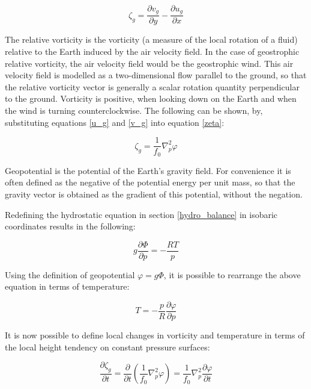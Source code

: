 \begin{equation}
    \zeta_g = \frac{\partial v_g}{\partial y} - \frac{\partial u_g}{\partial x}
    \label{zeta}
\end{equation}

The relative vorticity is the vorticity (a measure of the local rotation of a fluid) relative to the Earth induced by the air velocity field. In the case of geostrophic relative vorticity, the air velocity field would be the geostrophic wind. This air velocity field is modelled as a two-dimensional flow parallel to the ground, so that the relative vorticity vector is generally a scalar rotation quantity perpendicular to the ground. Vorticity is positive, when looking down on the Earth and when the wind is turning counterclockwise\cite{vorticity}. The following can be shown, by, substituting equations \ref{u_g} and \ref{v_g} into equation \ref{zeta}:

\begin{equation}
    \zeta_g = \frac{1}{f_0} \nabla^{2}_p \varphi      
\end{equation}

\begin{definition}
Geopotential is the potential of the Earth's gravity field. For convenience it is often defined as the negative of the potential energy per unit mass, so that the gravity vector is obtained as the gradient of this potential, without the negation.
\end{definition}

Redefining the hydrostatic equation in section \ref{hydro_balance} in isobaric coordinates results in the following:

\begin{equation}
    g \frac{\partial \Phi}{\partial p} = - \frac{R T}{p}
\end{equation}

Using the definition of geopotential $\varphi = g \Phi$, it is possible to rearrange the above equation in terms of temperature:

\begin{equation}
    T = - \frac{p}{R} \frac{\partial \varphi}{\partial p}    
\end{equation}

It is now possible to define local changes in vorticity and temperature in terms of the local height tendency on constant pressure surfaces:

\begin{equation}
    \frac{\partial \zeta_g}{\partial t} = \frac{\partial}{\partial t} (\frac{1}{f_0} \nabla^{2}_p \varphi) = \frac{1}{f_0} \nabla^{2}_p \frac{\partial \varphi}{\partial t}
\end{equation}


